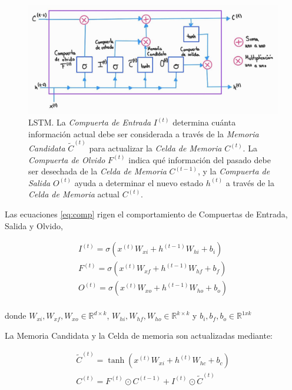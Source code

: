 \begin{figure}[ht!]
\centering
\includegraphics[width=1.0 \textwidth]{Chapters/2. Transformer/Figures/rnn/lstm.jpg}
\caption{LSTM. La \textit{Compuerta de Entrada} $I^{(t)}$ determina cuánta información actual debe
         ser considerada a través de la \textit{Memoria Candidata} $\tilde{C}^{(t)}$ para actualizar
         la \textit{Celda de Memoria} $C^{(t)}$. La \textit{Compuerta de Olvido} $F^{(t)}$ indica
         qué información del pasado debe ser desechada de la \textit{Celda de Memoria} $C^{(t-1)}$,
         y la \textit{Compuerta de Salida} $O^{(t)}$ ayuda a determinar el nuevo estado $h^{(t)}$ a
         través de la \textit{Celda de Memoria} actual $C^{(t)}$.}
\label{fig:rnn_lstm}
\end{figure}

Las ecuaciones \ref{eq:comp} rigen el comportamiento de Compuertas de Entrada, Salida y Olvido,

\begin{equation}
    \begin{split}
        I^{(t)} =  \sigma(x^{(t)} W_{xi} + h^{(t-1)} W_{hi} + b_i)\\
        F^{(t)} =  \sigma(x^{(t)} W_{xf} + h^{(t-1)} W_{hf} + b_f)\\
        O^{(t)} =  \sigma(x^{(t)} W_{xo} + h^{(t-1)} W_{ho} + b_o)\\
    \end{split}
    \label{eq:comp}
\end{equation}

\noindent donde $W_{xi}, W_{xf}, W_{xo} \in \mathbb{R}^{d \times k}$,
$W_{hi}, W_{hf}, W_{ho} \in \mathbb{R}^{k \times k}$ y $b_i, b_f, b_o \in \mathbb{R}^{1xk}$

La Memoria Candidata y la Celda de memoria son actualizadas mediante:

\begin{equation}
    \begin{split}
        \tilde C^{(t)} =  \tanh(x^{(t)} W_{xi} + h^{(t)} W_{hc} + b_c)\\
        C^{(t)} =  F^{(t)} \odot C^{(t-1)} + I^{(t)} \odot \tilde C^{(t)} \\
    \end{split}
\end{equation}

